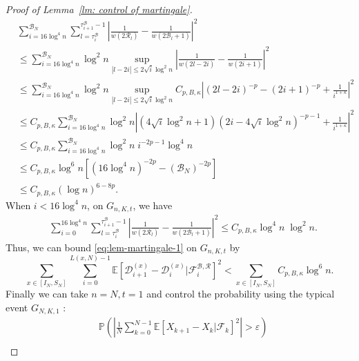 \documentclass[EJP]{ejpecp} %
\begin{document}
\begin{proof}[Proof of Lemma~\ref{lm: control of martingale}]
	\begin{align*}
		&\sum_{i = 16 \log^4 n}^{\mathscr{B}_N} \sum_{l = \tau_i^{\mathscr{B}}}^{\tau_{i+1}^{\mathscr{B}}-1} 
		\left| \frac{1}{w(2 \mathscr{R}_l)} - \frac{1}{w\left( 2 \mathscr{B}_l + 1 \right) } \right|^2 \\
		&\leq \sum_{i = 16 \log^4 n}^{\mathscr{B}_N} \log^2 n \sup_{|l - 2 i| \le 2 \sqrt{i} \log^2 n} 
		\left| \frac{1}{w(2 l - 2 i)} - \frac{1}{w\left(2 i + 1 \right) } \right|^2 \\
		&\leq \sum_{i = 16 \log^4 n}^{\mathscr{B}_N} \log^2 n \sup_{|l - 2 i| \le 2 \sqrt{i} \log^2 n} 
		C_{p, B, \kappa} \left| (2 l - 2 i)^{-p} - (2 i + 1)^{-p} + \frac{1}{i^{1 + \kappa}} \right|^2 \\
		&\leq C_{p, B, \kappa} \sum_{i = 16 \log^4 n}^{\mathscr{B}_N} \log^2 n  
		 \left| (4 \sqrt{i} \log^2 n + 1)(2 i - 4 \sqrt{i} \log^2 n)^{- p - 1} + \frac{1}{i^{1 + \kappa}} \right|^2 \\
		&\leq C_{p, B, \kappa} \sum_{i = 16 \log^4 n}^{\mathscr{B}_N} \log^2 n \; i^{- 2 p - 1} \log^4 n \\
		&\leq C_{p, B, \kappa} \log^6 n 
			\left[(16 \log^4 n)^{- 2 p} - (\mathscr{B}_N)^{-2p}\right] \\
		&\leq C_{p, B, \kappa} (\log n)^{6 - 8 p}
		.
	\end{align*}
	When $i < 16 \log^4 n$, on $G_{n, K, t}$, we have
	\begin{align*}
		&\sum_{i = 0}^{16 \log^4 n} \sum_{l = \tau_i^{\mathscr{B}}}^{\tau_{i+1}^{\mathscr{B}}-1} 
		\left| \frac{1}{w(2 \mathscr{R}_l)} - \frac{1}{w\left( 2 \mathscr{B}_l + 1 \right) } \right|^2 
		\leq C_{p, B, \kappa} \log^4 n \; \log^2 n
		.
	\end{align*}
	Thus, we can bound \eqref{eq:lem-martingale-1} on $G_{n, K, t}$ by
	\begin{equation*}
		\sum_{x \in \left[ I_N, S_N \right]} \sum_{i = 0}^{L(x,N) - 1} \mathbb{E}\left[ \mathscr{D}_{i+1}^{(x)} - \mathscr{D}_i^{(x)} | \mathcal{F}_{i}^{\mathscr{B}, \mathscr{R}} \right]^2 
		< \sum_{x \in \left[ I_N, S_N \right]} C_{p, B, \kappa} \log^6 n.
	\end{equation*}
	Finally we can take $n = N, t = 1$ and control the probability using the typical event $G_{N, K, 1}$ :
	\begin{align*}
		&\mathbb{P}\left( \left| \frac{1}{N} \sum_{k = 0}^{N-1} \mathbb{E}\left[ X_{k+1} - X_k | \mathcal{F}_k \right]^2  \right|  > \varepsilon \right)\\

\end{align*}
\end{proof}
\end{document}
